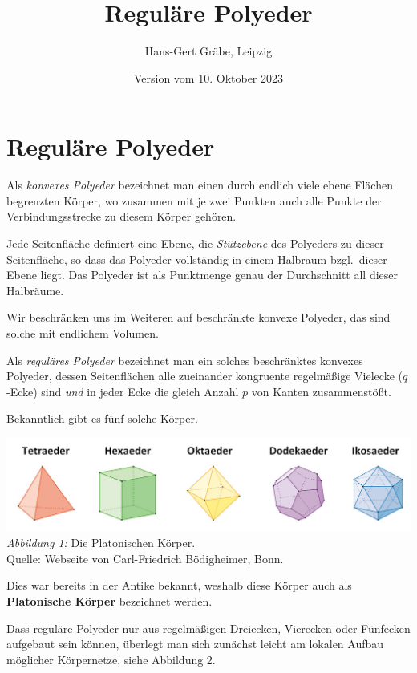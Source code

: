 \documentclass[11pt]{article}
\author{Hans-Gert Gräbe, Leipzig}
\title{Reguläre Polyeder\kosemnetlicensemark}
\date{Version vom 10. Oktober 2023}
\begin{document}
\maketitle

\section*{Reguläre Polyeder}

Als \emph{konvexes Polyeder} bezeichnet man einen durch endlich viele ebene
Flä\-chen begrenzten Körper, wo zusammen mit je zwei Punkten auch alle Punkte
der Verbindungsstrecke zu diesem Körper gehören.

Jede Seitenfläche definiert eine Ebene, die \emph{Stützebene} des Polyeders zu
dieser Seitenfläche, so dass das Polyeder vollständig in einem Halbraum
bzgl.\ dieser Ebene liegt. Das Polyeder ist als Punktmenge genau der
Durchschnitt all dieser Halbräume. 

Wir beschränken uns im Weiteren auf beschränkte konvexe Polyeder, das sind
solche mit endlichem Volumen. 

Als \emph{reguläres Polyeder} bezeichnet man ein solches beschränktes konvexes
Polyeder, dessen Seitenflächen alle zueinander kongruente regelmäßige Vielecke
($q$-Ecke) sind \emph{und} in jeder Ecke die gleich Anzahl $p$ von Kanten
zusammenstößt.

Bekanntlich gibt es fünf solche Körper.
\begin{center}
  \includegraphics[width=.8\textwidth]{graebe-05-1/PlatonischeKoerper.jpg}\\
  \emph{Abbildung 1:} Die Platonischen Körper.\\ Quelle: Webseite von
  Carl-Friedrich Bödigheimer, Bonn. 
\end{center}
Dies war bereits in der Antike bekannt, weshalb diese Körper auch als
\textbf{Platonische Körper} bezeichnet werden.  

Dass reguläre Polyeder nur aus regelmäßigen Dreiecken, Vierecken oder
Fünfecken aufgebaut sein können, überlegt man sich zunächst leicht am lokalen
Aufbau möglicher Körpernetze, siehe Abbildung 2.
\end{document}
